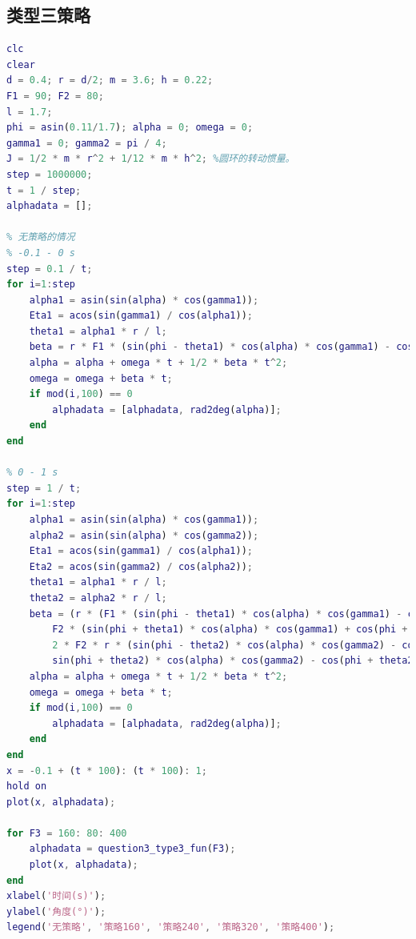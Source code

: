 \documentclass{cumcm}
\begin{document}
\subsection{类型三策略}
\begin{lstlisting}[language=matlab]
clc
clear
d = 0.4; r = d/2; m = 3.6; h = 0.22;
F1 = 90; F2 = 80;
l = 1.7;
phi = asin(0.11/1.7); alpha = 0; omega = 0;
gamma1 = 0; gamma2 = pi / 4;
J = 1/2 * m * r^2 + 1/12 * m * h^2; %圆环的转动惯量。
step = 1000000;
t = 1 / step;
alphadata = [];

% 无策略的情况
% -0.1 - 0 s
step = 0.1 / t;
for i=1:step
    alpha1 = asin(sin(alpha) * cos(gamma1));
    Eta1 = acos(sin(gamma1) / cos(alpha1));
    theta1 = alpha1 * r / l;
    beta = r * F1 * (sin(phi - theta1) * cos(alpha) * cos(gamma1) - cos(phi - theta1) * sin(alpha1) * sin(Eta1)) / J;
    alpha = alpha + omega * t + 1/2 * beta * t^2;
    omega = omega + beta * t;
    if mod(i,100) == 0
        alphadata = [alphadata, rad2deg(alpha)];
    end
end

% 0 - 1 s
step = 1 / t;
for i=1:step
    alpha1 = asin(sin(alpha) * cos(gamma1));
    alpha2 = asin(sin(alpha) * cos(gamma2));
    Eta1 = acos(sin(gamma1) / cos(alpha1));
    Eta2 = acos(sin(gamma2) / cos(alpha2));
    theta1 = alpha1 * r / l;
    theta2 = alpha2 * r / l;
    beta = (r * (F1 * (sin(phi - theta1) * cos(alpha) * cos(gamma1) - cos(phi - theta1) * sin(alpha1) * sin(Eta1)) - ...
        F2 * (sin(phi + theta1) * cos(alpha) * cos(gamma1) + cos(phi + theta1) * sin(alpha1) * sin(Eta1))) + ...
        2 * F2 * r * (sin(phi - theta2) * cos(alpha) * cos(gamma2) - cos(phi - theta2) * sin(alpha2) * sin(Eta2) - ...
        sin(phi + theta2) * cos(alpha) * cos(gamma2) - cos(phi + theta2) * sin(alpha2) * sin(Eta2))) / J;
    alpha = alpha + omega * t + 1/2 * beta * t^2;
    omega = omega + beta * t;
    if mod(i,100) == 0
        alphadata = [alphadata, rad2deg(alpha)];
    end
end
x = -0.1 + (t * 100): (t * 100): 1;
hold on
plot(x, alphadata);

for F3 = 160: 80: 400
    alphadata = question3_type3_fun(F3);
    plot(x, alphadata);
end
xlabel('时间(s)');
ylabel('角度(°)');
legend('无策略', '策略160', '策略240', '策略320', '策略400');
\end{lstlisting}
\end{document}
